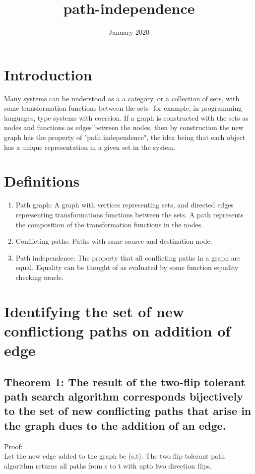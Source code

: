 \documentclass{article}
\title{path-independence}
\author{ }
\date{January 2020}
\begin{document}
\maketitle

\section{Introduction}

Many systems can be understood as a a category, or a collection of sets, with some transformation functions between the sets- for example, in programming languages, type systems with coercion. If a graph is constructed with the sets as nodes and functions as edges between the nodes, then by construction the new graph has the property of "path independence", the idea being that each object has a unique representation in a given set in the system.

\section{Definitions}
\begin{enumerate}
    \item Path graph: A graph with vertices representing sets, and directed edges representing transformations functions between the sets. A path represents the composition of the transformation functions in the nodes.
    \item Conflicting paths: Paths with same source and destination node.
    \item Path independence: The property that all conflicting paths in a graph are equal. Equality can be thought of as evaluated by some function equality checking oracle.
\end{enumerate}

\section{Identifying the set of new conflictiong paths on addition of edge}
\subsection{Theorem 1: The result of the two-flip tolerant path search algorithm corresponds bijectively to the set of new conflicting paths that arise in the graph dues to the addition of an edge.}

Proof:\\
Let the new edge added to the graph be (s,t).
The two flip tolerant path algorithm returns all paths from s to t with upto two direction flips.
\end{document}

